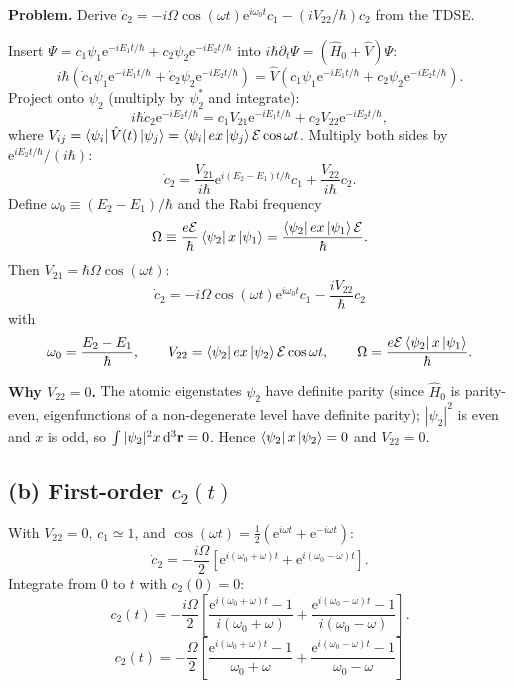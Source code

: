 \documentclass[11pt]{article}
\begin{document}
\textbf{Problem.} Derive $\dot c_{2}=-i\Omega\cos(\omega t)\mathrm{e}^{i\omega_{0}t}c_{1}-(iV_{22}/\hbar)c_{2}$ from the TDSE.

Insert $\Psi=c_{1}\psi_{1}\mathrm{e}^{-iE_{1}t/\hbar}+c_{2}\psi_{2}\mathrm{e}^{-iE_{2}t/\hbar}$ into $i\hbar\partial_{t}\Psi=(\hat H_{0}+\hat V)\Psi$:
\[
i\hbar\!\left(\dot c_{1}\psi_{1}\mathrm{e}^{-iE_{1}t/\hbar}+\dot c_{2}\psi_{2}\mathrm{e}^{-iE_{2}t/\hbar}\right)=\hat V\!\left(c_{1}\psi_{1}\mathrm{e}^{-iE_{1}t/\hbar}+c_{2}\psi_{2}\mathrm{e}^{-iE_{2}t/\hbar}\right).
\]
Project onto $\psi_{2}$ (multiply by $\psi_{2}^{*}$ and integrate):
\[
i\hbar\dot c_{2}\mathrm{e}^{-iE_{2}t/\hbar}=c_{1}V_{21}\mathrm{e}^{-iE_{1}t/\hbar}+c_{2}V_{22}\mathrm{e}^{-iE_{2}t/\hbar},
\]
where $V_{ij}=\bra{\psi_{i}}\hat V(t)\ket{\psi_{j}}=\bra{\psi_{i}}ex\ket{\psi_{j}}\mathcal{E}\cos\omega t$.
Multiply both sides by $\mathrm{e}^{iE_{2}t/\hbar}/(i\hbar)$:
\[
\dot c_{2}=\frac{V_{21}}{i\hbar}\mathrm{e}^{i(E_{2}-E_{1})t/\hbar}c_{1}+\frac{V_{22}}{i\hbar}c_{2}.
\]
Define $\omega_{0}\equiv (E_{2}-E_{1})/\hbar$ and the Rabi frequency
\[
\Omega\equiv\frac{e\mathcal{E}}{\hbar}\bra{\psi_{2}}x\ket{\psi_{1}}=\frac{\bra{\psi_{2}}ex\ket{\psi_{1}}\mathcal{E}}{\hbar}.
\]
Then $V_{21}=\hbar\Omega\cos(\omega t)$:
\[
\boxed{\;\dot c_{2}=-i\Omega\cos(\omega t)\mathrm{e}^{i\omega_{0}t}c_{1}-\frac{iV_{22}}{\hbar}c_{2}\;}
\]
with
\[
\omega_{0}=\frac{E_{2}-E_{1}}{\hbar},\qquad V_{22}=\bra{\psi_{2}}ex\ket{\psi_{2}}\mathcal{E}\cos\omega t,\qquad \Omega=\frac{e\mathcal{E}\bra{\psi_{2}}x\ket{\psi_{1}}}{\hbar}.
\]

\textbf{Why $V_{22}=0$.} The atomic eigenstates $\psi_{2}$ have definite parity (since $\hat H_{0}$ is parity-even, eigenfunctions of a non-degenerate level have definite parity); $|\psi_{2}|^{2}$ is even and $x$ is odd, so $\int|\psi_{2}|^{2}x\,\mathrm{d}^{3}\vb r=0$. Hence $\bra{\psi_{2}}x\ket{\psi_{2}}=0$ and $V_{22}=0$.

\subsection*{(b) First-order \texorpdfstring{$c_{2}(t)$}{c2(t)}}

With $V_{22}=0$, $c_{1}\simeq 1$, and $\cos(\omega t)=\tfrac{1}{2}(\mathrm{e}^{i\omega t}+\mathrm{e}^{-i\omega t})$:
\[
\dot c_{2}=-\frac{i\Omega}{2}\!\left[\mathrm{e}^{i(\omega_{0}+\omega)t}+\mathrm{e}^{i(\omega_{0}-\omega)t}\right].
\]
Integrate from $0$ to $t$ with $c_{2}(0)=0$:
\[
c_{2}(t)=-\frac{i\Omega}{2}\!\left[\frac{\mathrm{e}^{i(\omega_{0}+\omega)t}-1}{i(\omega_{0}+\omega)}+\frac{\mathrm{e}^{i(\omega_{0}-\omega)t}-1}{i(\omega_{0}-\omega)}\right].
\]
\[
\boxed{\;c_{2}(t)=-\frac{\Omega}{2}\!\left[\frac{\mathrm{e}^{i(\omega_{0}+\omega)t}-1}{\omega_{0}+\omega}+\frac{\mathrm{e}^{i(\omega_{0}-\omega)t}-1}{\omega_{0}-\omega}\right]\;}
\]
\end{document}
